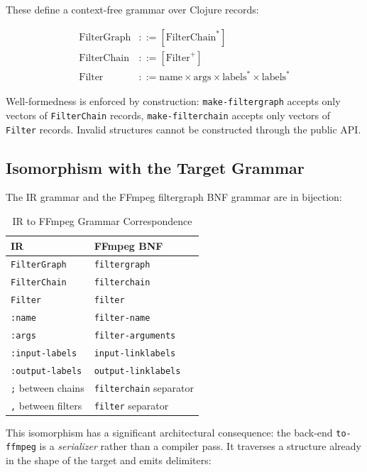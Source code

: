 \documentclass[conference]{IEEEtran}
\begin{document}
These define a context-free grammar over Clojure records:

\begin{align*}
\text{FilterGraph} &::= [\text{FilterChain}^*] \\
\text{FilterChain}  &::= [\text{Filter}^+] \\
\text{Filter}       &::= \text{name} \times \text{args} \times \text{labels}^* \times \text{labels}^*
\end{align*}

Well-formedness is enforced by construction: \texttt{make-filtergraph} accepts only vectors of \texttt{FilterChain} records, \texttt{make-filterchain} accepts only vectors of \texttt{Filter} records. Invalid structures cannot be constructed through the public API.

\subsection{Isomorphism with the Target Grammar}

The IR grammar and the FFmpeg filtergraph BNF grammar are in bijection:

\begin{table}[htbp]
\centering
\caption{IR to FFmpeg Grammar Correspondence}
\label{tab:isomorphism}
\begin{tabular}{ll}
\toprule
\textbf{IR} & \textbf{FFmpeg BNF} \\
\midrule
\texttt{FilterGraph} & \texttt{filtergraph} \\
\texttt{FilterChain} & \texttt{filterchain} \\
\texttt{Filter} & \texttt{filter} \\
\texttt{:name} & \texttt{filter-name} \\
\texttt{:args} & \texttt{filter-arguments} \\
\texttt{:input-labels} & \texttt{input-linklabels} \\
\texttt{:output-labels} & \texttt{output-linklabels} \\
\texttt{;} between chains & \texttt{filterchain} separator \\
\texttt{,} between filters & \texttt{filter} separator \\
\bottomrule
\end{tabular}
\end{table}

This isomorphism has a significant architectural consequence: the back-end \texttt{to-ffmpeg} is a \emph{serializer} rather than a compiler pass. It traverses a structure already in the shape of the target and emits delimiters:
\end{document}
